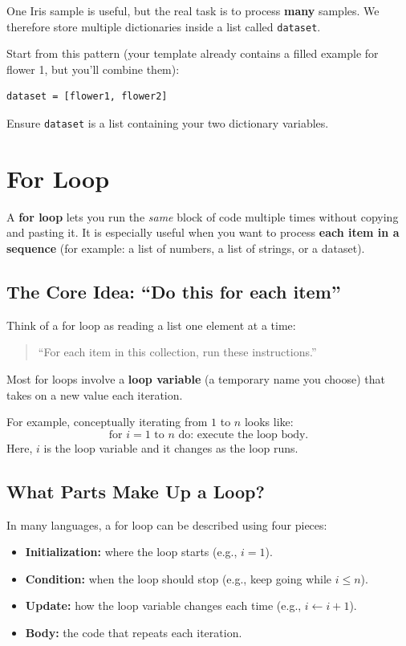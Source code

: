 One Iris sample is useful, but the real task is to process \textbf{many} samples.
We therefore store multiple dictionaries inside a list called \texttt{dataset}.

Start from this pattern (your template already contains a filled example for flower 1, but you'll combine them):
\begin{verbatim}
dataset = [flower1, flower2]
\end{verbatim}

\begin{tcolorbox}[title=Checkpoint]
Ensure \texttt{dataset} is a list containing your two dictionary variables.
\end{tcolorbox}

\section{For Loop}

A \textbf{for loop} lets you run the \emph{same} block of code multiple times without copying and pasting it. It is especially useful when you want to process \textbf{each item in a sequence} (for example: a list of numbers, a list of strings, or a dataset).

\subsection{The Core Idea: ``Do this for each item''}
Think of a for loop as reading a list one element at a time:
\begin{quote}
``For each item in this collection, run these instructions.''
\end{quote}

Most for loops involve a \textbf{loop variable} (a temporary name you choose) that takes on a new value each iteration.

For example, conceptually iterating from $1$ to $n$ looks like:
\[
\text{for } i = 1 \text{ to } n \text{ do: execute the loop body.}
\]
Here, $i$ is the loop variable and it changes as the loop runs.

\subsection{What Parts Make Up a Loop?}
In many languages, a for loop can be described using four pieces:
\begin{itemize}
  \item \textbf{Initialization:} where the loop starts (e.g., $i=1$).
  \item \textbf{Condition:} when the loop should stop (e.g., keep going while $i \le n$).
  \item \textbf{Update:} how the loop variable changes each time (e.g., $i \leftarrow i+1$).
  \item \textbf{Body:} the code that repeats each iteration.
\end{itemize}

